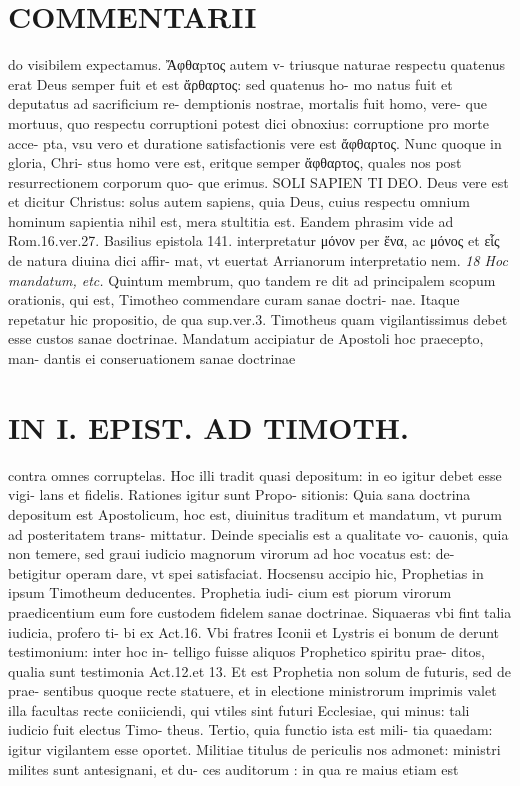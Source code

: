 \documentclass{article}
\begin{document}
\begin{pages}
\section*{COMMENTARII }
\marginpar{[ p.36 ]}\pstart do visibilem expectamus. Ἄφθαpτος autem v- triusque naturae respectu quatenus erat Deus semper fuit et est ἄρθαρτος: sed quatenus ho- mo natus fuit et deputatus ad sacrificium re- demptionis nostrae, mortalis fuit homo, vere- que mortuus, quo respectu corruptioni potest dici obnoxius: corruptione pro morte acce- pta, vsu vero et duratione satisfactionis vere est ἄφθαρτος. Nunc quoque in gloria, Chri- stus homo vere est, eritque semper ἄφθαρτος, quales nos post resurrectionem corporum quo- que erimus. SOLI SAPIEN TI DEO. Deus vere est et dicitur Christus: solus autem sapiens, quia Deus, cuius respectu omnium  hominum sapientia nihil est, mera stultitia est. Eandem phrasim vide ad Rom.16.ver.27. Basilius epistola 141. interpretatur μόνον per ἕνα, ac μόνος et εἷς  de natura diuina dici affir- mat, vt euertat Arrianorum interpretatio nem.  \pend
\textit{18 Hoc mandatum, etc. }\pstart Quintum membrum, quo tandem re dit ad principalem scopum orationis, qui est, Timotheo commendare curam sanae doctri- nae. Itaque repetatur hic propositio, de qua sup.ver.3. Timotheus quam vigilantissimus debet esse custos sanae doctrinae. Mandatum accipiatur de Apostoli hoc praecepto, man- dantis ei conseruationem sanae doctrinae  \pend
\section*{IN I. EPIST. AD TIMOTH. }
\marginpar{[ p.39 ]}\pstart contra omnes corruptelas. Hoc illi tradit quasi depositum: in eo igitur debet esse vigi- lans et fidelis. Rationes igitur sunt Propo- sitionis: Quia sana doctrina depositum est Apostolicum, hoc est, diuinitus traditum et mandatum, vt purum ad posteritatem trans- mittatur. Deinde specialis est a qualitate vo- cauonis, quia non temere, sed graui iudicio magnorum virorum ad hoc vocatus est: de- betigitur operam dare, vt spei satisfaciat. Hocsensu accipio hic, Prophetias in ipsum Timotheum deducentes. Prophetia iudi- cium est piorum virorum praedicentium eum fore custodem fidelem sanae doctrinae.  \pend\pstart Siquaeras vbi fint talia iudicia, profero ti- bi ex Act.16. Vbi fratres Iconii et Lystris ei bonum de derunt testimonium: inter hoc in- telligo fuisse aliquos Prophetico spiritu prae- ditos, qualia sunt testimonia Act.12.et 13. Et est Prophetia non solum de futuris, sed de prae- sentibus quoque recte statuere, et in electione ministrorum imprimis valet illa facultas recte coniiciendi, qui vtiles sint futuri Ecclesiae, qui minus: tali iudicio fuit electus Timo- theus. Tertio, quia functio ista est mili- tia quaedam: igitur vigilantem esse oportet. Militiae titulus de periculis nos admonet: ministri milites sunt antesignani, et du- ces auditorum : in qua re maius etiam est  \pend

\end{pages}
\end{document}
